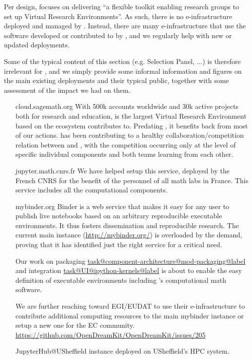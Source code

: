 \documentclass{deliverablereport}
\makeatletter
\newcommand\localtaskref[2]{\hyperref[#1@#2]{\csname task@#1@#2@label\endcsname}}
\makeatother
\begin{document}
\label{infrastructures}

Per design, \ODK focuses on delivering ``a flexible toolkit enabling
research groups to set up Virtual Research Environments''. As such,
there is no e-infrastructure deployed and managed by \ODK. Instead,
there are many e-infrastructure that use the software developed or
contributed to by \ODK, and we regularly help with new or updated
deployments.

Some of the typical content of this section (e.g. Selection Panel,
...) is therefore irrelevant for \ODK, and we simply provide some
informal information and figures on the main existing deployments and
their typical public, together with some assessment of the impact we
had on them.

\begin{itemize}
\item[cloud.sagemath.org] With 500k accounts worldwide and 30k active
  projects both for research and education, \SMC is the largest
  Virtual Research Environment based on the ecosystem \ODK contributes
  to. Predating \ODK, it benefits back from most of our actions. \ODK
  has been contributing to a healthy collaboration/competition
  relation between \JupyterHub and \SMC, with the competition
  occurring only at the level of specific individual components and
  both teams learning from each other.

\item[jupyter.math.cnrs.fr] We have helped setup this \JupyterHub
  service, deployed by the French CNRS for the benefit of the
  personnel of all math labs in France. This service includes all the
  \ODK computational components.

\item[mybinder.org] Binder is a web service that makes it easy for any
  user to publish live notebooks based on an arbitrary reproducible
  executable environments. It thus fosters dissemination and
  reproducible research. The current main instance
  (\url{http://mybinder.org/}) is overloaded by the demand, proving
  that it has identified just the right service for a critical need.

  Our work on packaging
  \localtaskref{component-architecture}{mod-packaging} and \Jupyter
  integration \localtaskref{UI}{ipython-kernels} is about to enable
  the easy definition of executable environments including \ODK's
  computational math software.

  We are further reaching toward EGI/EUDAT to use their
  e-infrastructure to contribute additional computing resources to the
  main mybinder instance or setup a new one for the EC community.
  \url{https://github.com/OpenDreamKit/OpenDreamKit/issues/205}

\item [JupyterHub@USheffield]
  \href{http://docs.iceberg.shef.ac.uk/en/latest/using-iceberg/accessing/jupyterhub.html}{\JupyterHub}
  instance deployed on USheffield's HPC system.
\end{itemize}
\end{document}

